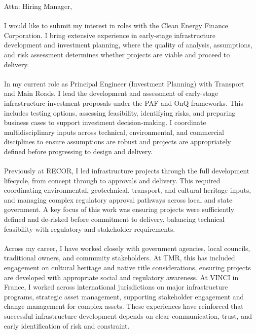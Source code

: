 %
%
%





\par{Attn: Hiring Manager,\\
	\\
	I would like to submit my interest in roles with the Clean Energy Finance Corporation. I bring extensive experience in early-stage infrastructure development and investment planning, where the quality of analysis, assumptions, and risk assessment determines whether projects are viable and proceed to delivery.\\
	\\
	In my current role as Principal Engineer (Investment Planning) with Transport and Main Roads, I lead the development and assessment of early-stage infrastructure investment proposals under the PAF and OnQ frameworks. This includes testing options, assessing feasibility, identifying risks, and preparing business cases to support investment decision-making. I coordinate multidisciplinary inputs across technical, environmental, and commercial disciplines to ensure assumptions are robust and projects are appropriately defined before progressing to design and delivery.\\
	\\
	Previously at RECOR, I led infrastructure projects through the full development lifecycle, from concept through to approvals and delivery. This required coordinating environmental, geotechnical, transport, and cultural heritage inputs, and managing complex regulatory approval pathways across local and state government. A key focus of this work was ensuring projects were sufficiently defined and de-risked before commitment to delivery, balancing technical feasibility with regulatory and stakeholder requirements.\\
	\\
	Across my career, I have worked closely with government agencies, local councils, traditional owners, and community stakeholders. At TMR, this has included engagement 	on cultural heritage and native title considerations, ensuring projects are developed with appropriate social and regulatory awareness. At VINCI in France, I worked across international jurisdictions on major infrastructure programs, strategic asset management, supporting stakeholder engagement and change management for complex assets. These experiences have reinforced that successful infrastructure development depends on clear communication, trust, and early identification of risk and constraint.\\
}
